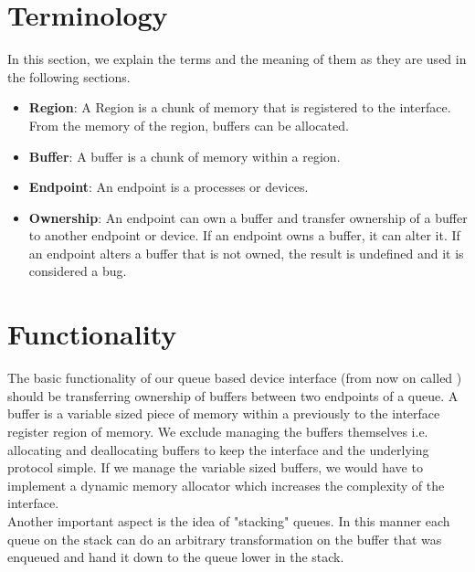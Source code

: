 \documentclass[a4paper,11pt,twoside]{report}
\begin{document}
	\section{Terminology}
	In this section, we explain the terms and the meaning of them as they are used in the following sections.
	\begin{itemize}
		
		\item \textbf{Region}: A Region is a chunk of memory that is registered to the \devif interface. From the memory of the region, buffers can be allocated.
		\item \textbf{Buffer}: A buffer is a chunk of memory within a region.
		\item \textbf{Endpoint}: An endpoint is a processes or devices. 
		\item \textbf{Ownership}: An endpoint can own a buffer and transfer ownership of a buffer to another endpoint or device. 
		If an endpoint owns a buffer, it can alter it. If an endpoint alters a buffer that is not owned, 
		the result is undefined and it is considered a bug. 
	\end{itemize}
	
	\section{Functionality}
	The basic functionality of our queue based device interface (from now on called \devif) 
	should be transferring ownership of buffers between two endpoints of a queue.  
	A buffer is a variable sized piece of memory within a previously to the \devif interface 
	register region of memory. We exclude managing the buffers themselves i.e. allocating 
	and deallocating buffers to keep the interface and the underlying protocol simple. 
	If we manage the variable sized buffers, we would have to implement a dynamic memory 
	allocator which increases the complexity of the \devif interface. 
	\\
	Another important aspect is the idea of "stacking" queues. In this manner each 
	queue on the stack can do an arbitrary transformation on the buffer that was enqueued 
	and hand it down to the queue lower in the stack. 
	
\end{document}
